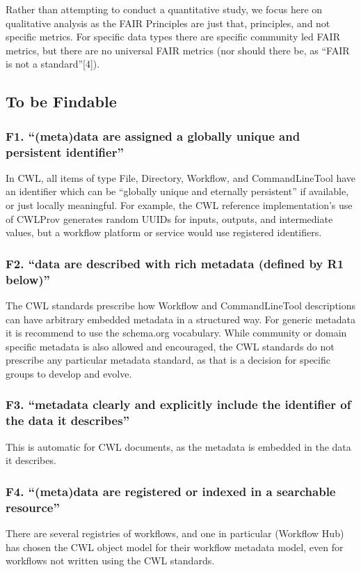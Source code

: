 Rather than attempting to conduct a quantitative study, we focus here on qualitative analysis as the FAIR Principles are just that, principles, and not specific metrics. For specific data types there are specific community led FAIR metrics, but there are no universal FAIR metrics (nor should there be, as “FAIR is not a standard”[4]).
\subsection{To be Findable}
\subsubsection{F1. “(meta)data are assigned a globally unique and persistent identifier”}
In CWL, all items of type File, Directory, Workflow, and CommandLineTool have an identifier which can be “globally unique and eternally persistent” if available, or just locally meaningful. For example, the CWL reference implementation’s use of CWLProv generates random UUIDs for inputs, outputs, and intermediate values, but a workflow platform or service would use registered identifiers.
\subsubsection{F2. “data are described with rich metadata (defined by R1 below)”}
The CWL standards prescribe how Workflow and CommandLineTool descriptions can have arbitrary embedded metadata in a structured way. For generic metadata it is recommend to use the schema.org vocabulary. While community or domain specific metadata is also allowed and encouraged, the CWL standards do not prescribe any particular metadata standard, as that is a decision for specific groups to develop and evolve.
\subsubsection{F3. “metadata clearly and explicitly include the identifier of the data it describes”}
This is automatic for CWL documents, as the metadata is embedded in the data it describes.
\subsubsection{F4. “(meta)data are registered or indexed in a searchable resource”}
There are several registries of workflows, and one in particular (Workflow Hub) has chosen the CWL object model for their workflow metadata model, even for workflows not written using the CWL standards.
